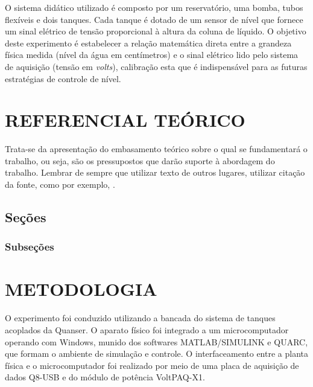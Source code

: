 \documentclass[a4paper,12pt]{article}
\begin{document}
\begin{flushleft}
\hspace{4ex}O sistema didático utilizado é composto por um reservatório, uma bomba, tubos flexíveis e dois tanques. Cada tanque é dotado de um sensor de nível que fornece um sinal elétrico de tensão proporcional à altura da coluna de líquido. O objetivo deste experimento é estabelecer a relação matemática direta entre a grandeza física medida (nível da água em centímetros) e o sinal elétrico lido pelo sistema de aquisição (tensão em \textit{volts}), calibração esta que é indispensável para as futuras estratégias de controle de nível.
\end{flushleft}

\newpage


\thispagestyle{main}

\section{REFERENCIAL TEÓRICO}



Trata-se da apresentação do embasamento teórico sobre o qual se fundamentará
o trabalho, ou seja, são os pressupostos que darão suporte à abordagem do trabalho.
Lembrar de sempre que utilizar texto de outros lugares, utilizar citação da fonte, como por exemplo, \cite{LATEX04}.

\subsection{Seções}

\subsubsection{Subseções}

\newpage


\thispagestyle{main}

\section{METODOLOGIA}

\begin{flushleft}
    \hspace{4ex}O experimento foi conduzido utilizando a bancada do sistema de tanques acoplados da Quanser. O aparato físico foi integrado a um microcomputador operando com Windows, munido dos softwares MATLAB/SIMULINK e QUARC, que formam o ambiente de simulação e controle. O interfaceamento entre a planta física e o microcomputador foi realizado por meio de uma placa de aquisição de dados Q8-USB e do módulo de potência VoltPAQ-X1.
\end{flushleft}
\end{document}
